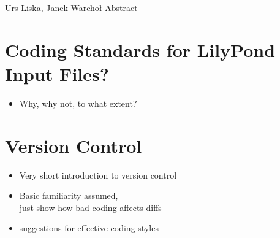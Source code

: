 \documentclass[../../LilyPond-Tutorials]{subfiles}
\begin{document}
\begin{authorAbstract}{Urs Liska, Janek Warchoł}
Abstract
\end{authorAbstract}

\chapter{Coding Standards for LilyPond Input Files?}
\label{chap:cs_coding-standards}
\begin{itemize}
\item Why, why not, to what extent?
\end{itemize}

\chapter{Version Control}
\label{chap:cs_version-control}
\begin{itemize}
\item Very short introduction to version control
\item Basic familiarity assumed,\\
just show how bad coding affects diffs
\item suggestions for effective coding styles
\end{itemize}
\end{document}
